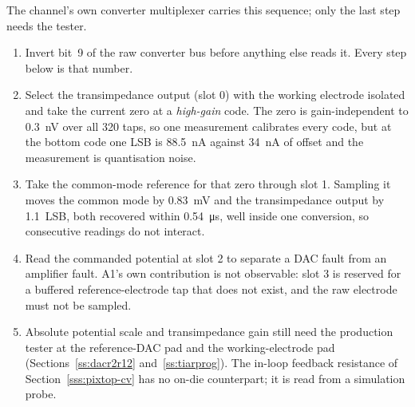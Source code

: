 The channel's own converter multiplexer carries this sequence; only the last
step needs the tester.
\begin{enumerate}[nosep]
\item Invert bit~9 of the raw converter bus before anything else reads it. Every
  step below is that number.
\item Select the transimpedance output (slot 0) with the working electrode
  isolated and take the current zero at a \emph{high-gain} code. The zero is
  gain-independent to \SI{0.3}{\nano\volt} over all 320 taps, so one
  measurement calibrates every code, but at the bottom code one LSB is
  \SI{88.5}{\nano\ampere} against \SI{34}{\nano\ampere} of offset and the
  measurement is quantisation noise.
\item Take the common-mode reference for that zero through slot 1. Sampling it
  moves the common mode by \SI{0.83}{\milli\volt} and the transimpedance output
  by \SI{1.1}{LSB}, both recovered within \SI{0.54}{\micro\second}, well
  inside one conversion, so consecutive readings do not interact.
\item Read the commanded potential at slot 2 to separate a DAC fault from an
  amplifier fault. A1's own contribution is not observable: slot 3 is reserved
  for a buffered reference-electrode tap that does not exist, and the raw
  electrode must not be sampled.
\item Absolute potential scale and transimpedance gain still need the
  production tester at the reference-DAC pad and the working-electrode pad
  (Sections~\ref{ss:dacr2r12} and~\ref{ss:tiarprog}). The in-loop feedback
  resistance of Section~\ref{sss:pixtop-cv} has no on-die counterpart; it is
  read from a simulation probe.
\end{enumerate}
